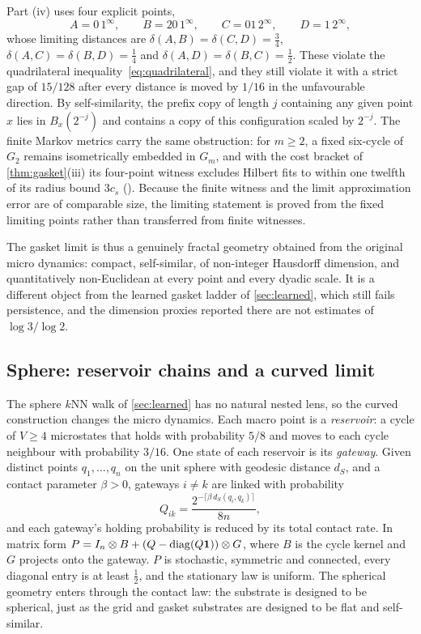 Part (iv) uses four explicit points,
\begin{equation}
A=0\,1^{\infty},\qquad B=20\,1^{\infty},\qquad C=01\,2^{\infty},\qquad D=1\,2^{\infty},
\end{equation}
whose limiting distances are $\delta(A,B)=\delta(C,D)=\tfrac34$, $\delta(A,C)=\delta(B,D)=\tfrac14$ and $\delta(A,D)=\delta(B,C)=\tfrac12$.
These violate the quadrilateral inequality~\eqref{eq:quadrilateral}, and they still violate it with a strict gap of $15/128$ after every distance is moved by $1/16$ in the unfavourable direction.
By self-similarity, the prefix copy of length $j$ containing any given point $x$ lies in $B_x(2^{-j})$ and contains a copy of this configuration scaled by $2^{-j}$.
The finite Markov metrics carry the same obstruction: for $m\ge2$, a fixed six-cycle of $G_2$ remains isometrically embedded in $G_m$, and with the cost bracket of \cref{thm:gasket}(iii) its four-point witness excludes Hilbert fits to within one twelfth of its radius bound $3c_s$ ().
Because the finite witness and the limit approximation error are of comparable size, the limiting statement is proved from the fixed limiting points rather than transferred from finite witnesses.

The gasket limit is thus a genuinely fractal geometry obtained from the original micro dynamics: compact, self-similar, of non-integer Hausdorff dimension, and quantitatively non-Euclidean at every point and every dyadic scale.
It is a different object from the learned gasket ladder of \cref{sec:learned}, which still fails persistence, and the dimension proxies reported there are not estimates of $\log3/\log2$.

\subsection{Sphere: reservoir chains and a curved limit}
\label{sec:sphere}

The sphere $k$NN walk of \cref{sec:learned} has no natural nested lens, so the curved construction changes the micro dynamics.
Each macro point is a \emph{reservoir}: a cycle of $V\ge4$ microstates that holds with probability $5/8$ and moves to each cycle neighbour with probability $3/16$.
One state of each reservoir is its \emph{gateway}.
Given distinct points $q_1,\dots,q_n$ on the unit sphere with geodesic distance $d_S$, and a contact parameter $\beta>0$, gateways $i\neq k$ are linked with probability
\begin{equation}
Q_{ik}=\frac{2^{-\lceil\beta\, d_S(q_i,q_k)\rceil}}{8n},
\end{equation}
and each gateway's holding probability is reduced by its total contact rate.
In matrix form $P=I_n\otimes B+(Q-\operatorname{diag}(Q\mathbf{1}))\otimes G$, where $B$ is the cycle kernel and $G$ projects onto the gateway.
$P$ is stochastic, symmetric and connected, every diagonal entry is at least $\tfrac12$, and the stationary law is uniform.
The spherical geometry enters through the contact law: the substrate is designed to be spherical, just as the grid and gasket substrates are designed to be flat and self-similar.

